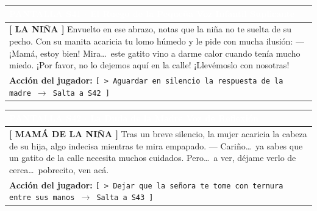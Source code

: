 \documentclass[11pt, a4paper]{article}
\begin{document}
\noindent
\begin{tabularx}{\textwidth}{|X|}
\hline
\rowcolor{colorExito}
\textbf{\textcolor{white}{PANTALLA S41 $\cdot$ El Ruego de la Pequeña}} \hfill \small\textcolor{white}{Voz Infantil Suplicante} \\ \hline
\rowcolor{colorTextoBox}
\textbf{\textcolor{colorEmisor}{[ LA NIÑA ]}} \vspace{0.2em}\newline
Envuelto en ese abrazo, notas que la niña no te suelta de su pecho. Con su manita acaricia tu lomo húmedo y le pide con mucha ilusión: \newline
--- ¡Mamá, estoy bien! Mira\ldots\ este gatito vino a darme calor cuando tenía mucho miedo. ¡Por favor, no lo dejemos aquí en la calle! ¡Llevémoslo con nosotras! \\ \hline
\rowcolor{colorBotonBox}
\textbf{Acción del jugador:} \newline
\texttt{[ > Aguardar en silencio la respuesta de la madre $\rightarrow$ Salta a S42 ]} \\ \hline
\end{tabularx}

\vspace{1em}

\noindent
\begin{tabularx}{\textwidth}{|X|}
\hline
\rowcolor{colorExito}
\textbf{\textcolor{white}{PANTALLA S42 $\cdot$ La Duda de la Madre}} \hfill \small\textcolor{white}{Voz de Reflexión} \\ \hline
\rowcolor{colorTextoBox}
\textbf{\textcolor{colorEmisor}{[ MAMÁ DE LA NIÑA ]}} \vspace{0.2em}\newline
Tras un breve silencio, la mujer acaricia la cabeza de su hija, algo indecisa mientras te mira empapado. \newline
--- Cariño\ldots\ ya sabes que un gatito de la calle necesita muchos cuidados. Pero\ldots\ a ver, déjame verlo de cerca\ldots\ pobrecito, ven acá. \\ \hline
\rowcolor{colorBotonBox}
\textbf{Acción del jugador:} \newline
\texttt{[ > Dejar que la señora te tome con ternura entre sus manos $\rightarrow$ Salta a S43 ]} \\ \hline
\end{tabularx}

\vspace{1em}
\end{document}
